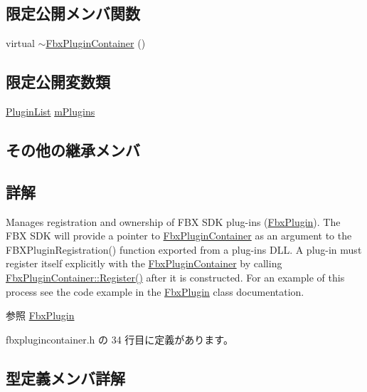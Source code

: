 \subsection*{限定公開メンバ関数}
\begin{DoxyCompactItemize}
\item 
virtual \hyperlink{class_fbx_plugin_container_a8c4030ad7c08c7fdab1b34b7d37ed88e}{$\sim$\+Fbx\+Plugin\+Container} ()
\end{DoxyCompactItemize}
\subsection*{限定公開変数類}
\begin{DoxyCompactItemize}
\item 
\hyperlink{class_fbx_plugin_container_a42abd8471efa91f56de2c4c64c220972}{Plugin\+List} \hyperlink{class_fbx_plugin_container_a89a3739ecdf85a1eaeb72ad8bd8a0587}{m\+Plugins}
\end{DoxyCompactItemize}
\subsection*{その他の継承メンバ}


\subsection{詳解}
Manages registration and ownership of F\+BX S\+DK plug-\/ins (\hyperlink{class_fbx_plugin}{Fbx\+Plugin}). The F\+BX S\+DK will provide a pointer to \hyperlink{class_fbx_plugin_container}{Fbx\+Plugin\+Container} as an argument to the F\+B\+X\+Plugin\+Registration() function exported from a plug-\/in\textquotesingle{}s D\+LL. A plug-\/in must register itself explicitly with the \hyperlink{class_fbx_plugin_container}{Fbx\+Plugin\+Container} by calling \hyperlink{class_fbx_plugin_container_a3fc28ffe0296973afb3014112b4b0df0}{Fbx\+Plugin\+Container\+::\+Register()} after it is constructed. For an example of this process see the code example in the \hyperlink{class_fbx_plugin}{Fbx\+Plugin} class documentation. \begin{DoxySeeAlso}{参照}
\hyperlink{class_fbx_plugin}{Fbx\+Plugin} 
\end{DoxySeeAlso}


 fbxplugincontainer.\+h の 34 行目に定義があります。



\subsection{型定義メンバ詳解}
\mbox{\label{class_fbx_plugin_container_a42abd8471efa91f56de2c4c64c220972}} 
